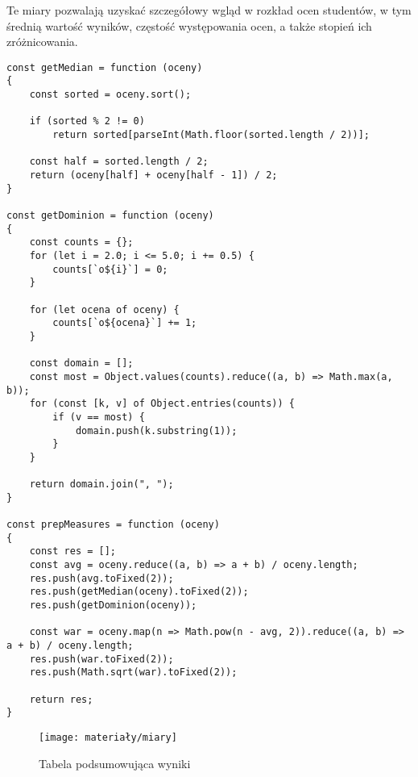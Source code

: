 Te miary pozwalają uzyskać szczegółowy wgląd w rozkład ocen studentów, w tym średnią wartość wyników, częstość występowania ocen, a także stopień ich zróżnicowania.
\begin{empty}
	\begin{verbatim}
const getMedian = function (oceny)
{
	const sorted = oceny.sort();
	
	if (sorted % 2 != 0)
		return sorted[parseInt(Math.floor(sorted.length / 2))];
	
	const half = sorted.length / 2;
	return (oceny[half] + oceny[half - 1]) / 2;
}

const getDominion = function (oceny)
{
	const counts = {};
	for (let i = 2.0; i <= 5.0; i += 0.5) {
		counts[`o${i}`] = 0;
	}
	
	for (let ocena of oceny) {
		counts[`o${ocena}`] += 1;
	}
	
	const domain = [];
	const most = Object.values(counts).reduce((a, b) => Math.max(a, b));
	for (const [k, v] of Object.entries(counts)) {
		if (v == most) {
			domain.push(k.substring(1));
		}
	}
	
	return domain.join(", ");
}

const prepMeasures = function (oceny)
{
	const res = [];
	const avg = oceny.reduce((a, b) => a + b) / oceny.length;
	res.push(avg.toFixed(2));
	res.push(getMedian(oceny).toFixed(2));
	res.push(getDominion(oceny));
	
	const war = oceny.map(n => Math.pow(n - avg, 2)).reduce((a, b) => a + b) / oceny.length;
	res.push(war.toFixed(2));
	res.push(Math.sqrt(war).toFixed(2));
	
	return res;
}	
	\end{verbatim}
	\vspace{-10pt}
\end{empty}

\begin{figure}[ht]
	\centering
	\texttt{[image: materiały/miary]}
	\caption{Tabela podsumowująca wyniki}
\end{figure}

